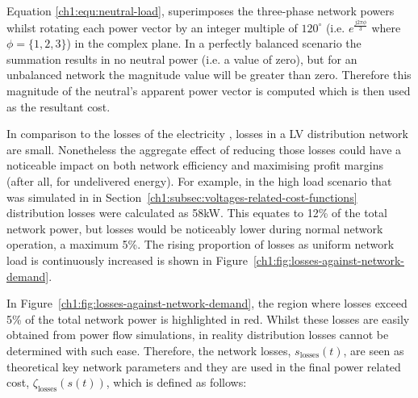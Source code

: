 

Equation \ref{ch1:equ:neutral-load}, superimposes the three-phase network powers whilst rotating each power vector by an integer multiple of $120^\circ$ (i.e. $e^\frac{j2\pi \phi}{3}$ where $\phi = \{1, 2, 3\}$) in the complex plane.
In a perfectly balanced scenario the summation results in no neutral power (i.e. a value of zero), but for an unbalanced network the magnitude value will be greater than zero.
Therefore this magnitude of the neutral's apparent power vector is computed which is then used as the resultant cost.

In comparison to the losses of the  electricity , losses in a LV distribution network are  small.
Nonetheless the aggregate effect of reducing those losses could have a noticeable impact on both network efficiency and maximising profit margins (after all,  for undelivered energy).
For example, in the high load scenario that was simulated in in Section~\ref{ch1:subsec:voltages-related-cost-functions} distribution losses were calculated as 58kW.
This equates to 12\% of the total network power, but losses would be noticeably lower during normal network operation,  a maximum  5\%.
The rising proportion of losses as uniform network load is continuously increased is shown in Figure~\ref{ch1:fig:losses-against-network-demand}.




In Figure~\ref{ch1:fig:losses-against-network-demand}, the region where losses exceed 5\% of the total network power is highlighted in red.
Whilst these losses are easily obtained from power flow simulations, in reality distribution losses cannot be determined with such ease.
Therefore, the network losses, $s_\text{losses}(t)$, are seen as theoretical key network parameters and they are used in the final power related cost, $\zeta_\text{losses}(s(t))$, which is defined as follows:

